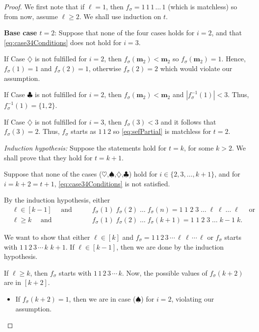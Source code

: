 \documentclass[reqno]{amsart}
\theoremstyle{definition}
\newcommand{\caseOne}{\ensuremath{\heartsuit}}
\newcommand{\caseTwo}{\ensuremath{\spadesuit}}
\newcommand{\caseThree}{\ensuremath{\diamondsuit}}
\newcommand{\caseFour}{\ensuremath{\clubsuit}}
\newcommand{\img}{\mathbf{m}}
\begin{document}
\begin{proof}
We first note that if $\ell=1$, then $f_{\sigma}=1\,1\,1\,\dotsc \,1$ (which is matchless)
so from now, assume $\ell\geq 2$. 
We shall use induction on $t$.

\textbf{Base case $t=2$}: Suppose that none of the four cases holds 
for $i=2$, and that \eqref{eq:case34Conditions} does not hold for $i=3$.

If Case {\caseThree} is not fulfilled for $i=2$, then
$f_{\sigma}(\img_2)<\img_2$ so $f_{\sigma}(\img_2)=1$.
Hence, $f_{\sigma}(1)=1$ and 
$f_{\sigma}(2)=1$, otherwise $f_{\sigma}(2)=2$ 
which would violate our assumption.

If Case {\caseFour} is not fulfilled for $i=2$, then
$f_{\sigma}(\img_2)<\img_2$ and $|f_{\sigma}^{-1}(1)|<3$.
Thus, $f_{\sigma}^{-1}(1)=\{1,2\}$.

If Case {\caseThree} is not fulfilled for $i=3$, then
$f_{\sigma}(3)<3$ and it follows that $f_{\sigma}(3)=2$.
Thus, $f_{\sigma}$ starts as $1\,1\,2$ so \eqref{eq:sefPartial}
is matchless for $t=2$.

\bigskip 
\noindent
\emph{Induction hypothesis:}
Suppose the statements hold for $t=k$, 
for some $k>2$. We shall prove that they hold for $t=k+1$.

Suppose that none of the cases (\caseOne,\caseTwo,\caseThree,\caseFour)
hold for $i \in \{2,3,\dotsc,k+1\}$,
and for $i=k+2=t+1$, \eqref{eq:case34Conditions} is not satisfied.

By the induction hypothesis, either
\begin{align*}
 &\ell \in [k-1] \quad \text{ and } \quad 
 &&f_\sigma(1)\; f_\sigma(2)\; \dotsc \; f_\sigma(n) = 1\;1\;2\;3\;\dotsc\;\ell\; \ell\;\dotsc\;\ell
 \quad  \text{ or} \\
 & \ell \geq k \quad \text{ and } \quad  &&f_\sigma(1)\; f_\sigma(2)\; \dotsc \; f_\sigma(k+1) 
 = 1\;1\;2\;3\; \dotsc\; k{-}1 \; k.
\end{align*}
   
We want to show that either $\ell\in [k]$ and 
   $f_{\sigma}=1\,1\,2\,3\,\dotsb\,\ell\,\ell\,\dotsb\,\ell
     $ or $f_{\sigma}$ starts with 
   $1\,1\,2\,3\,\dotsb\,k\,\,k{+}1$.
If $\ell\in [k-1]$, then we are done by the induction hypothesis.

If $\ell \geq k$, then $f_{\sigma}$ starts with $1\,1\,2\,3\,\dotsb\,k$.
Now, the possible values of $f_{\sigma}(k+2)$ are in $[k+2]$.
%
\begin{itemize}
 \item 
If $f_{\sigma}(k+2)=1$, then we are in case (\caseTwo) for $i=2$, violating our assumption.


\end{itemize}
\end{proof}
\end{document}
